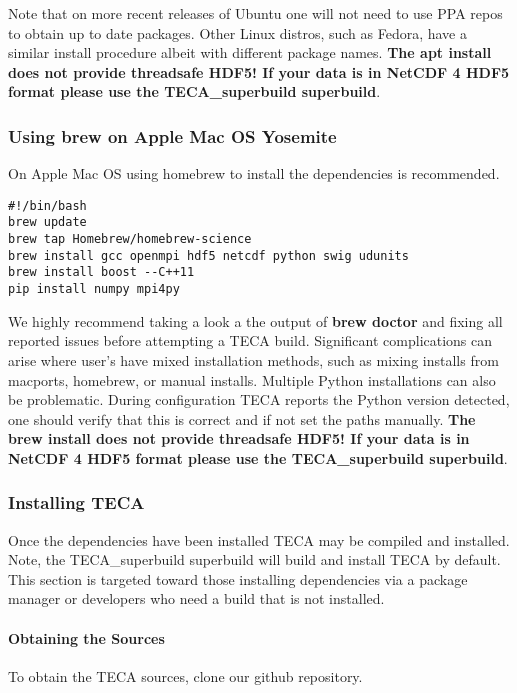 \documentclass[a4paper,10pt,DIV=12]{scrreprt}
\begin{document}
\noindent Note that on more recent releases of Ubuntu one will not need to use PPA repos to obtain up to date packages.
Other Linux distros, such as Fedora, have a similar install procedure albeit with different package names.
\textbf{\color{red} The apt install does not provide threadsafe HDF5! If your data is in NetCDF 4 HDF5 format please use the
TECA\_superbuild superbuild}.

\subsubsection{Using brew on Apple Mac OS Yosemite}
On Apple Mac OS using homebrew to install the dependencies is recommended.

\vspace{2mm}\hspace{0.2in}\begin{minipage}{0.8\textwidth}
\begin{verbatim}
#!/bin/bash
brew update
brew tap Homebrew/homebrew-science
brew install gcc openmpi hdf5 netcdf python swig udunits
brew install boost --C++11
pip install numpy mpi4py
\end{verbatim}
\end{minipage}\vspace{2mm}

\noindent We highly recommend taking a look a the output of \textbf{brew doctor} and
fixing all reported issues before attempting a TECA build. Significant
complications can arise where user's have mixed installation methods, such as mixing
installs from macports, homebrew, or manual installs. Multiple Python installations
can also be problematic. During configuration TECA reports the Python version detected,
one should verify that this is correct and if not set the paths manually. \textbf{
\color{red} The brew install does not provide threadsafe HDF5! If your data is in
NetCDF 4 HDF5 format please use the TECA\_superbuild superbuild}.

\subsubsection{Installing TECA}
Once the dependencies have been installed TECA may be compiled and installed. Note,
the TECA\_superbuild superbuild will build and install TECA by default. This section
is targeted toward those installing dependencies via a package manager or developers
who need a build that is not installed.

\paragraph{Obtaining the Sources} To obtain the TECA sources, clone our github repository.
\end{document}
